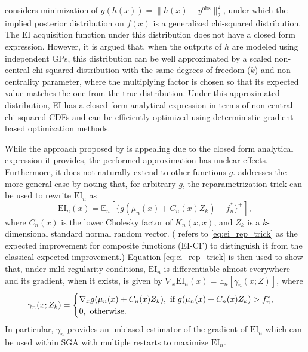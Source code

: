 \documentclass{wscpaperproc}
\newcommand{\E}{\mathbb{E}}
\newcommand{\EI}{\mathrm{EI}}
\newcommand{\savelength}[1]{} %
\theoremstyle{wsc}
\begin{document}
 considers minimization of $g(h(x))=\|h(x) - y^{\mathrm{obs}}\|_2^2$, under which the implied posterior distribution on $f(x)$ is a generalized chi-squared distribution. The EI acquisition function under this distribution does not have a closed form expression. However, it is argued that, when the outputs of $h$ are modeled using independent GPs, this distribution can be well approximated by a scaled non-central chi-squared distribution with the same degrees of freedom ($k$) and non-centrality parameter, where the multiplying factor is chosen so that its expected value matches the one from the true distribution. Under this approximated distribution, EI has a closed-form analytical expression in terms of non-central chi-squared CDFs and can be efficiently optimized using deterministic gradient-based optimization methods. 

While the approach proposed by  is appealing due to the closed form analytical expression it provides, the performed approximation has unclear effects. Furthermore, it does not naturally extend to other functions $g$.  addresses the more general case by noting that, for arbitrary $g$, the reparametrization trick can be used to rewrite $\EI_n$ as
\begin{equation}
\label{eq:ei_rep_trick}
    \EI_n(x) =\E_n[\{g(\mu_n(x) + C_n(x)Z_k) - f_n^*\}^+],
\end{equation}
where $C_n(x)$ is the lower Cholesky  factor of $K_n(x,x)$, and $Z_k$ is a $k$-dimensional standard normal random vector. ( refers to \eqref{eq:ei_rep_trick} as the expected improvement for composite functions (EI-CF) to distinguish it from the classical expected improvement.) Equation \eqref{eq:ei_rep_trick} is then used to show that, under mild regularity conditions, $\EI_n$ is differentiable almost everywhere and its gradient, when it exists, is given by $\nabla_{x}\EI_n(x) = \E_n[\gamma_{n}(x;Z)]$, where
\begin{equation*}
    \gamma_n(x;Z_k) = \begin{cases}
\nabla_x g(\mu_{n}(x) + C_{n}(x)Z_k), \textnormal{ if } g(\mu_{n}(x) + C_{n}(x)Z_k) >  f_n^*,\\
0, \textnormal{ otherwise.}
\end{cases}
\end{equation*}
In particular, $\gamma_n$ provides an unbiased estimator of the gradient of $\EI_n$ which can be used within SGA with multiple restarts to maximize $\EI_n$. 
\savelength{
This approach is analogous to the one proposed by \shortciteN{wang2016parallel} for maximizing a batch version of EI that also lacks a closed-form analytical expression.
}
\end{document}
